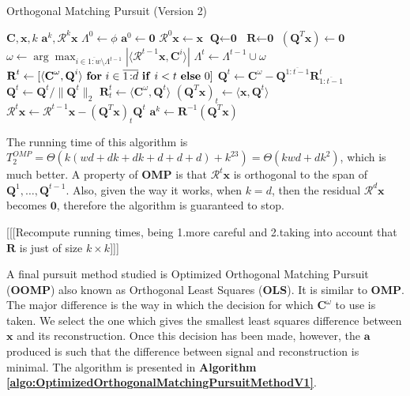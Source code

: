 \documentclass[12pt,a4paper,oneside,english]{UPBThesis}
\newcommand{\hctimes}[2]{{#1}\!\times\!{#2}}
\newcommand{\hcrange}[2]{\overline{{#1}\colon\!\!{#2}}}
\begin{document}
\begin{algorithm}
\caption{Orthogonal Matching Pursuit (Version 2)}
\label{algo:OrthogonalMatchingPursuitMethodV2}
\begin{algorithmic}
\Require $\textbf{C},\textbf{x},k$
\Ensure $\textbf{a}^k,\mathcal{R}^k\textbf{x}$
\State $\Lambda^0 \gets \phi$
\State $\textbf{a}^0 \gets \textbf{0}$
\State $\mathcal{R}^0\textbf{x} \gets \textbf{x}$
\State $\textbf{Q} \gets \textbf{0}$
\State $\textbf{R} \gets \textbf{0}$
\State $(\textbf{Q}^T\textbf{x}) \gets \textbf{0}$
\For {$t = \hcrange{1}{k}$}
\State $\omega \gets \arg \max_{i \in \hcrange{1}{w} \setminus \Lambda^{t-1}} \left| \langle \mathcal{R}^{t-1}\textbf{x} , \textbf{C}^i \rangle \right|$
\State $\Lambda^t \gets \Lambda^{t-1} \cup \omega$
\State $\textbf{R}^t \gets [ \langle \textbf{C}^\omega, \textbf{Q}^i \rangle~\mbox{\textbf{for} $i \in \hcrange{1}{d}$ \textbf{if} $i < t$ \textbf{else} $0$} ]$ 
\State $\textbf{Q}^t \gets \textbf{C}^\omega - \textbf{Q}^{\hcrange{1}{t-1}}\textbf{R}^t_{\hcrange{1}{t-1}}$ 
\State $\textbf{Q}^t \gets \textbf{Q}^t / \| \textbf{Q}^t \|_2$ 
\State $\textbf{R}^t_t \gets \langle \textbf{C}^\omega, \textbf{Q}^t \rangle$
\State $(\textbf{Q}^T\textbf{x})_t \gets \langle \textbf{x}, \textbf{Q}^t \rangle$
\State $\mathcal{R}^t\textbf{x} \gets \mathcal{R}^{t-1}\textbf{x} -  (\textbf{Q}^T\textbf{x})_t \textbf{Q}^t$
\EndFor
\State $\textbf{a}^k \gets \textbf{R}^{-1}(\textbf{Q}^T\textbf{x})$
\end{algorithmic}
\end{algorithm}

The running time of this algorithm is $T_2^{OMP} = \Theta(k(wd + dk + dk + d + d + d) + k^23) = \Theta(kwd + dk^2)$, which is much better. A property of \textbf{OMP} is that $\mathcal{R}^t\textbf{x}$ is orthogonal to the span of $\textbf{Q}^1,\dots,\textbf{Q}^{t-1}$. Also, given the way it works, when $k = d$, then the residual $\mathcal{R}^d\textbf{x}$ becomes $\textbf{0}$, therefore the algorithm is guaranteed to stop.

[[[Recompute running times, being 1.more careful and 2.taking into account that $\textbf{R}$ is just of size $\hctimes{k}{k}$]]]

A final pursuit method studied is Optimized Orthogonal Matching Pursuit (\textbf{OOMP}) \cite{optimizedorthopursuit,orthogonalls} also known as Orthogonal Least Squares (\textbf{OLS}). It is similar to \textbf{OMP}. The major difference is the way in which the decision for which $\textbf{C}^\omega$ to use is taken. We select the one which gives the smallest least squares difference between $\textbf{x}$ and its reconstruction. Once this decision has been made, however, the $\textbf{a}$ produced is such that the difference between signal and reconstruction is minimal. The algorithm is presented in \textbf{Algorithm \ref{algo:OptimizedOrthogonalMatchingPursuitMethodV1}}.
\end{document}
